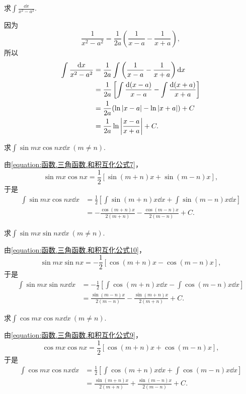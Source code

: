 \begin{example}
求\(\int \frac{\dd{x}}{x^2 - a^2}\).
\begin{solution}
因为\[
	\frac{1}{x^2 - a^2}
	= \frac{1}{2a} \left(\frac{1}{x-a} - \frac{1}{x+a}\right),
\]
所以\begin{align}
	\int \frac{\dd{x}}{x^2 - a^2}
	&= \frac{1}{2a} \int \left(\frac{1}{x-a} - \frac{1}{x+a}\right) \dd{x}
		\nonumber \\
	&= \frac{1}{2a} \left[ \int \frac{\dd(x-a)}{x-a} - \int \frac{\dd(x+a)}{x+a} \right]
		\nonumber \\
	&= \frac{1}{2a} ( \ln\abs{x-a} - \ln\abs{x+a} ) + C
		\nonumber \\
	&= \frac{1}{2a} \ln\abs{\frac{x-a}{x+a}} + C.
\end{align}
\end{solution}
\end{example}

\begin{example}
求\(\int \sin mx \cos nx \dd{x}\ (m \neq n)\).
\begin{solution}
由\cref{equation:函数.三角函数.和积互化公式7}，
\[
	\sin mx \cos nx
	= \frac12 [\sin(m+n)x + \sin(m-n)x],
\]
于是\begin{align}
	\int \sin mx \cos nx \dd{x}
	&= \frac12 \left[
		\int \sin(m+n)x \dd{x}
		+ \int \sin(m-n)x \dd{x}
	\right]
	\nonumber \\
	&= -\frac{\cos(m+n)x}{2(m+n)}
		- \frac{\cos(m-n)x}{2(m-n)}
		+ C.
\end{align}
\end{solution}
\end{example}

\begin{example}
求\(\int \sin mx \sin nx \dd{x}\ (m \neq n)\).
\begin{solution}
由\cref{equation:函数.三角函数.和积互化公式10}，
\[
	\sin mx \sin nx
	= -\frac12 [\cos(m+n)x - \cos(m-n)x],
\]
于是\begin{align}
	\int \sin mx \sin nx \dd{x}
	&= -\frac12 \left[
		\int \cos(m+n)x \dd{x}
		- \int \cos(m-n)x \dd{x}
	\right]
	\nonumber \\
	&= \frac{\sin(m-n)x}{2(m-n)}
		- \frac{\sin(m+n)x}{2(m+n)}
		+ C.
\end{align}
\end{solution}
\end{example}

\begin{example}
求\(\int \cos mx \cos nx \dd{x}\ (m \neq n)\).
\begin{solution}
由\cref{equation:函数.三角函数.和积互化公式9}，
\[
	\cos mx \cos nx
	= \frac12 [\cos(m+n)x + \cos(m-n)x],
\]
于是\begin{align}
	\int \cos mx \cos nx \dd{x}
	&= \frac12 \left[
		\int \cos(m+n)x \dd{x}
		+ \int \cos(m-n)x \dd{x}
	\right]
	\nonumber \\
	&= \frac{\sin(m+n)x}{2(m+n)}
		+ \frac{\sin(m-n)x}{2(m-n)}
		+ C.
\end{align}
\end{solution}
\end{example}

